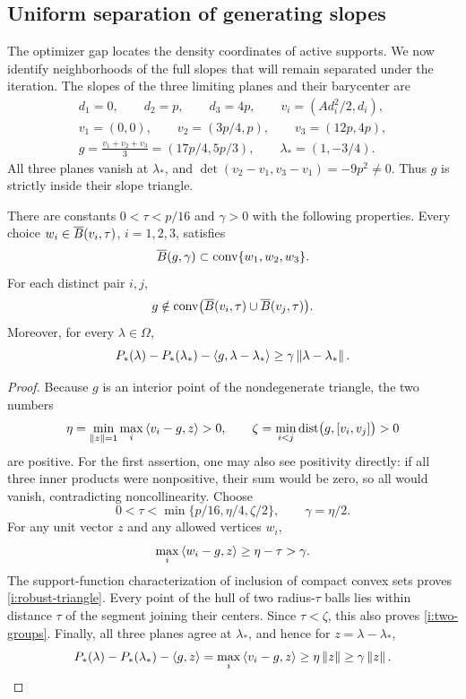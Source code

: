 \subsection{Uniform separation of generating slopes}

The optimizer gap locates the density coordinates of active supports.
We now identify neighborhoods of the full slopes that will remain separated
under the iteration.  The slopes of the three limiting planes and their
barycenter are
\begin{equation}
 \begin{gathered}
 d_1=0,\qquad d_2=p,\qquad d_3=4p,\qquad
 v_i=(Ad_i^2/2,d_i),\\
 v_1=(0,0),\qquad v_2=(3p/4,p),\qquad v_3=(12p,4p),\\
 g=\frac{v_1+v_2+v_3}{3}=(17p/4,5p/3),\qquad
 \lambda_*=(1,-3/4).
 \end{gathered}
 \label{i:slopes}
\end{equation}
All three planes vanish at \(\lambda_*\), and
\(\det(v_2-v_1,v_3-v_1)=-9p^2\ne0\).  Thus \(g\) is strictly
inside their slope triangle.

\begin{lemma}
\label{i:geometry}
There are constants \(0<\tau<p/16\) and \(\gamma>0\) with the
following properties.  Every choice
\(w_i\in\overline B(v_i,\tau)\), \(i=1,2,3\), satisfies
\begin{equation}
 \overline B(g,\gamma)\subset\operatorname{conv}\{w_1,w_2,w_3\}.
 \label{i:robust-triangle}
\end{equation}
For each distinct pair \(i,j\),
\begin{equation}
 g\notin\operatorname{conv}\bigl(\overline B(v_i,\tau)\cup\overline B(v_j,\tau)\bigr).
 \label{i:two-groups}
\end{equation}
Moreover, for every \(\lambda\in\Omega\),
\begin{equation}
 P_*(\lambda)-P_*(\lambda_*)
       -\left\langle g,\lambda-\lambda_*\right\rangle
 \ge\gamma\left\lVert\lambda-\lambda_*\right\rVert.
 \label{i:linear-growth}
\end{equation}
\end{lemma}

\begin{proof}
Because \(g\) is an interior point of the nondegenerate triangle, the
two numbers
\[
 \eta=\min_{\left\lVert z\right\rVert=1}\max_i\left\langle v_i-g,z\right\rangle>0,
 \qquad
 \zeta=\min_{i<j}\operatorname{dist}\bigl(g,[v_i,v_j]\bigr)>0
\]
are positive.  For the first assertion, one may also see positivity
directly: if all three inner products were nonpositive, their sum would
be zero, so all would vanish, contradicting noncollinearity.
Choose
\[
 0<\tau<\min\{p/16,\eta/4,\zeta/2\},
 \qquad \gamma=\eta/2.
\]
For any unit vector \(z\) and any allowed vertices \(w_i\),
\[
 \max_i\left\langle w_i-g,z\right\rangle\ge\eta-\tau>\gamma.
\]
The support-function characterization of inclusion of compact convex
sets proves \eqref{i:robust-triangle}.  Every point of the hull of two
radius-\(\tau\) balls lies within distance \(\tau\) of the segment
joining their centers.  Since \(\tau<\zeta\), this also proves
\eqref{i:two-groups}.  Finally, all three planes agree at
\(\lambda_*\), and hence for \(z=\lambda-\lambda_*\),
\[
 P_*(\lambda)-P_*(\lambda_*)-\left\langle g,z\right\rangle
 =\max_i\left\langle v_i-g,z\right\rangle\ge\eta\left\lVert z\right\rVert\ge\gamma\left\lVert z\right\rVert.
\]
\end{proof}

